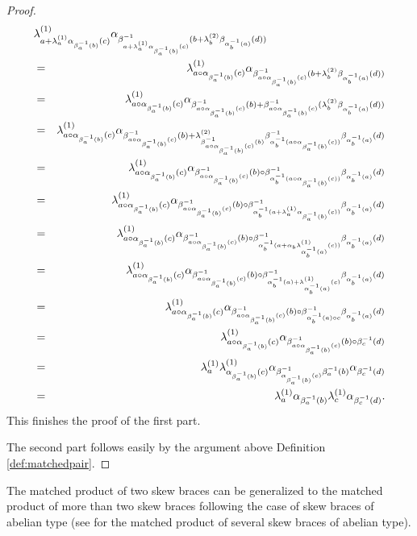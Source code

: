\begin{proof}
\begin{eqnarray*}
	\lefteqn{\lambda^{(1)}_{a+\lambda^{(1)}_{a}\alpha_{\beta^{-1}_{a}(b)}(c)}\alpha_{\beta^{-1}_{a+\lambda^{(1)}_{a}\alpha_{\beta^{-1}_{a}(b)}(c)}(b+\lambda^{(2)}_{b}\beta_{\alpha^{-1}_{b}(a)}(d))}}\\
	&=& \lambda^{(1)}_{a\circ \alpha_{\beta^{-1}_{a}(b)}(c)}\alpha_{\beta^{-1}_{a\circ \alpha_{\beta^{-1}_{a}(b)}(c)}(b+\lambda^{(2)}_{b}\beta_{\alpha^{-1}_{b}(a)}(d))}\\
	&=& \lambda^{(1)}_{a\circ \alpha_{\beta^{-1}_{a}(b)}(c)}\alpha_{\beta^{-1}_{a\circ \alpha_{\beta^{-1}_{a}(b)}(c)}(b)+\beta^{-1}_{a\circ \alpha_{\beta^{-1}_{a}(b)}(c)}(\lambda^{(2)}_{b}\beta_{\alpha^{-1}_{b}(a)}(d))}\\
	&=& \lambda^{(1)}_{a\circ \alpha_{\beta^{-1}_{a}(b)}(c)}\alpha_{\beta^{-1}_{a\circ \alpha_{\beta^{-1}_{a}(b)}(c)}(b)+\lambda^{(2)}_{\beta^{-1}_{a\circ \alpha_{\beta^{-1}_{a}(b)}(c)}(b)}\beta^{-1}_{\alpha^{-1}_b(a\circ \alpha_{\beta^{-1}_a(b)}(c))}\beta_{\alpha^{-1}_{b}(a)}(d)}\\
	&=& \lambda^{(1)}_{a\circ \alpha_{\beta^{-1}_{a}(b)}(c)}\alpha_{\beta^{-1}_{a\circ \alpha_{\beta^{-1}_{a}(b)}(c)}(b)\circ \beta^{-1}_{\alpha^{-1}_b(a\circ \alpha_{\beta^{-1}_a(b)}(c))}\beta_{\alpha^{-1}_{b}(a)}(d)}\\
	&=& \lambda^{(1)}_{a\circ \alpha_{\beta^{-1}_{a}(b)}(c)}\alpha_{\beta^{-1}_{a\circ \alpha_{\beta^{-1}_{a}(b)}(c)}(b)\circ \beta^{-1}_{\alpha^{-1}_b(a+\lambda^{(1)}_a\alpha_{\beta^{-1}_a(b)}(c))}\beta_{\alpha^{-1}_{b}(a)}(d)}\\
	&=& \lambda^{(1)}_{a\circ \alpha_{\beta^{-1}_{a}(b)}(c)}\alpha_{\beta^{-1}_{a\circ \alpha_{\beta^{-1}_{a}(b)}(c)}(b)\circ \beta^{-1}_{\alpha^{-1}_b(a+\alpha_b\lambda^{(1)}_{\alpha^{-1}_b(a)}(c))}\beta_{\alpha^{-1}_{b}(a)}(d)}\\
	&=& \lambda^{(1)}_{a\circ \alpha_{\beta^{-1}_{a}(b)}(c)}\alpha_{\beta^{-1}_{a\circ \alpha_{\beta^{-1}_{a}(b)}(c)}(b)\circ \beta^{-1}_{\alpha^{-1}_b(a)+\lambda^{(1)}_{\alpha^{-1}_b(a)}(c)}\beta_{\alpha^{-1}_{b}(a)}(d)}\\
	&=& \lambda^{(1)}_{a\circ \alpha_{\beta^{-1}_{a}(b)}(c)}\alpha_{\beta^{-1}_{a\circ \alpha_{\beta^{-1}_{a}(b)}(c)}(b)\circ \beta^{-1}_{\alpha^{-1}_b(a)\circ c}\beta_{\alpha^{-1}_{b}(a)}(d)}\\
	&=& \lambda^{(1)}_{a\circ \alpha_{\beta^{-1}_{a}(b)}(c)}\alpha_{\beta^{-1}_{a\circ \alpha_{\beta^{-1}_{a}(b)}(c)}(b)\circ \beta^{-1}_{c}(d)}\\
	&=& \lambda^{(1)}_{a}\lambda^{(1)}_{\alpha_{\beta^{-1}_{a}(b)}(c)}\alpha_{\beta^{-1}_{\alpha_{\beta^{-1}_{a}(b)}(c)}\beta^{-1}_a(b)}\alpha_{\beta^{-1}_{c}(d)}\\
	&=& \lambda^{(1)}_{a}\alpha_{\beta^{-1}_a(b)}\lambda^{(1)}_{c}\alpha_{\beta^{-1}_{c}(d)}.
\end{eqnarray*}
This finishes the proof of the first part.

The second part follows easily by the argument above Definition \ref{def:matchedpair}.
\end{proof}
The matched product of two skew braces can be generalized to the matched product of more than two skew braces following the case of skew braces of abelian type (see \cite{MR3812099} for the matched product of several skew braces of abelian type). 

